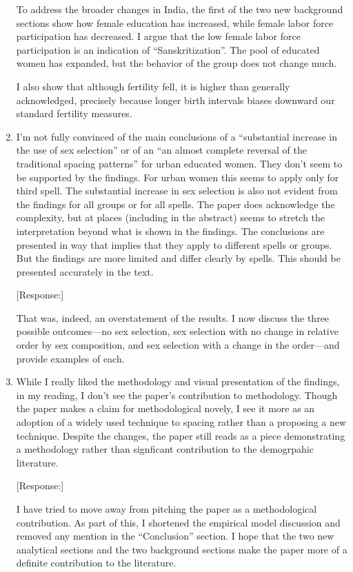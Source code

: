 \documentclass[letterpaper,12pt]{article}
\begin{document}
\begin{enumerate}
To address the broader changes in India, the first of the two new
background sections show how female education has increased, while
female labor force participation has decreased. I argue that the low
female labor force participation is an indication of
``Sanskritization''. The pool of educated women has expanded, but the
behavior of the group does not change much.

I also show that although fertility fell, it is higher than generally
acknowledged, precisely because longer birth intervals biases downward
our standard fertility measures.


\item I’m not fully convinced of the main conclusions of a “substantial
increase in the use of sex selection” or of an “an almost complete
reversal of the traditional spacing patterns” for urban educated women.
They don’t seem to be supported by the findings. For urban women this
seems to apply only for third spell. The substantial increase in sex
selection is also not evident from the findings for all groups or for
all spells. The paper does acknowledge the complexity, but at places
(including in the abstract) seems to stretch the interpretation beyond
what is shown in the findings. The conclusions are presented in way that
implies that they apply to different spells or groups. But the findings
are more limited and differ clearly by spells. This should be presented
accurately in the text.

[Response:]

That was, indeed, an overstatement of the results. I now discuss the
three possible outcomes---no sex selection, sex selection with no change
in relative order by sex composition, and sex selection with a change in
the order---and provide examples of each. 

\item While I really liked the methodology and visual presentation of the
findings, in my reading, I don’t see the paper’s contribution to
methodology. Though the paper makes a claim for methodological novely, I
see it more as an adoption of a widely used technique to spacing rather
than a proposing a new technique. Despite the changes, the paper still
reads as a piece demonstrating a methodology rather than signficant
contribution to the demogrpahic literature.

[Response:]

I have tried to move away from pitching the paper as a methodological
contribution. As part of this, I shortened the empirical model
discussion and removed any mention in the ``Conclusion'' section.
I hope that the two new analytical sections and the two background sections 
make the paper more of a definite contribution to the literature.




\end{enumerate}
\end{document}
